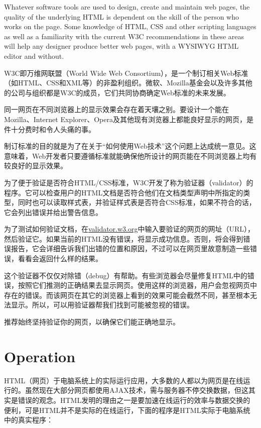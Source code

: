 Whatever software tools are used to design, create and maintain web pages, the quality of the underlying HTML is dependent on the skill of the person who works on the page. Some knowledge of HTML, CSS and other scripting languages as well as a familiarity with the current W3C recommendations in these areas will help any designer produce better web pages, with a WYSIWYG HTML editor and without.

W3C即万维网联盟（World Wide Web Consortium），是一个制订相关Web标准（如HTML、CSS和XML等）的非盈利组织。微软、Mozilla基金会以及许多其他的公司与组织都是W3C的成员，它们共同协商确定Web标准的未来发展。

同一网页在不同浏览器上的显示效果会存在着天壤之别。要设计一个能在Mozilla、Internet Explorer、Opera及其他现有浏览器上都能良好显示的网页，是件十分费时和令人头痛的事。

制订标准的目的就是为了在关于“如何使用Web技术”这个问题上达成统一意见。这意味着，Web开发者只要遵循标准就能确保他所设计的网页能在不同浏览器上均有较良好的显示效果。

为了便于验证是否符合HTML/CSS标准，W3C开发了称为验证器（validator）的程序。它可以检查用户的HTML文档是否符合他们在文档类型声明中所指定的类型，同时也可以读取样式表，并验证样式表是否符合CSS标准，如果不符合的话，它会列出错误并给出警告信息。


为了测试如何验证文档，在\href{http://validator.w3.org/}{validator.w3.org}中输入要验证的网页的网址（URL），然后验证它。如果当前的HTML没有错误，将显示成功信息。否则，将会得到错误报告，它会详细告诉我们出错的位置和原因，不过可以在网页里故意制造一些错误，看看会返回什么样的结果。

这个验证器不仅仅对除错（debug）有帮助。有些浏览器会尽量修复HTML中的错误，按照它们推测的正确结果去显示网页。使用这样的浏览器，用户会忽视网页中存在的错误。而该网页在其它的浏览器上看到的效果可能会截然不同，甚至根本无法显示。所以，可以用验证器帮我们找到可能被忽视的错误。

推荐始终坚持验证你的网页，以确保它们能正确地显示。


\chapter{Operation}

HTML（网页）于电脑系统上的实际运行应用，大多数的人都以为网页是在线运行的。虽然现在大部分网页都使用AJAX技术，需与服务器不停交换数据，但这其实是错误的观念。HTML发明的理由之一是要加速在线运行的效率与数据交换的便利，可是HTML并不是实际的在线运行，下面的程序是HTML实际于电脑系统中的真实程序：

